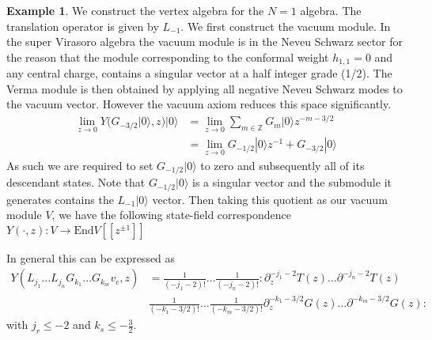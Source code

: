 \documentclass[a4paper,reqno,12pt]{report}
\theoremstyle{definition}
\newtheorem{exmp}{Example}[section]
\newcommand{\Z}{\mathbb{Z}}
\newcommand{\ket}{\rangle}
\numberwithin{equation}{section}
\renewcommand{\le}{\leqslant}
\theoremstyle{plain}
\begin{document}
\begin{exmp}
We construct the vertex algebra for the $N=1$ algebra. The translation operator is given by $L_{-1}$. We first construct the vacuum module. In the super Virasoro algebra the vacuum module is in the Neveu Schwarz sector for the reason that the module corresponding to the conformal weight $h_{1,1}=0$ and any central charge, contains a singular vector at a half integer grade (1/2). The Verma module is then obtained by applying all negative Neveu Schwarz modes to the vacuum vector. However the vacuum axiom reduces this space significantly. 
\begin{align*}
\lim_{z\to 0}Y(G_{-3/2}|0\ket, z)|0\ket &= \lim_{z\to 0}\sum_{m\in \Z} G_m|0\ket z^{-m-3/2}\\
&=\lim_{z\to 0}G_{-1/2}|0\ket z^{-1} + G_{-3/2}|0\ket 
\end{align*}
As such we are required to set $G_{-1/2}|0\ket$ to zero and subsequently all of its descendant states. Note that $G_{-1/2}|0\ket$ is a singular vector and the submodule it generates contains the $L_{-1}|0\ket$ vector. Then taking this quotient as our vacuum module $V$, we have the following state-field correspondence $Y(\cdot, z):V\rightarrow \text{End}V[[z^{\pm 1}]]$

\begin{center}
\end{center}

In general this can be expressed as
\begin{align*}
Y(L_{j_1}\dots L_{j_n}G_{k_1}\dots G_{k_m}v_c,z) &= \frac{1}{(-j_1-2)!}\dots\frac{1}{(-j_n-2)!}:\partial_z^{-j_1-2}T(z)\dots\partial^{-j_n-2}T(z)\\
&\frac{1}{(-k_1-3/2)!}\dots\frac{1}{(-k_m-3/2)!}\partial_z^{-k_1-3/2}G(z)\dots\partial^{-k_m-3/2}G(z):
\end{align*}
with $j_r\le-2$ and $k_s\le -\frac{3}{2}$.\\
\end{exmp}
\end{document}
